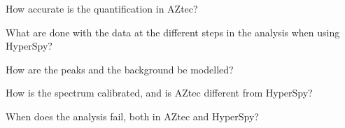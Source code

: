 \begin{subprob} \label{subproblem1}
    How accurate is the quantification in AZtec?
\end{subprob}
\begin{subprob} \label{subproblem2}
    What are done with the data at the different steps in the analysis when using HyperSpy?
\end{subprob}
\begin{subprob} \label{subproblem3}
    How are the peaks and the background be modelled?
\end{subprob}
\begin{subprob} \label{subproblem4}
    How is the spectrum calibrated, and is AZtec different from HyperSpy?
\end{subprob}
\begin{subprob} \label{subproblem6}
    When does the analysis fail, both in AZtec and HyperSpy?
\end{subprob}



%
%



